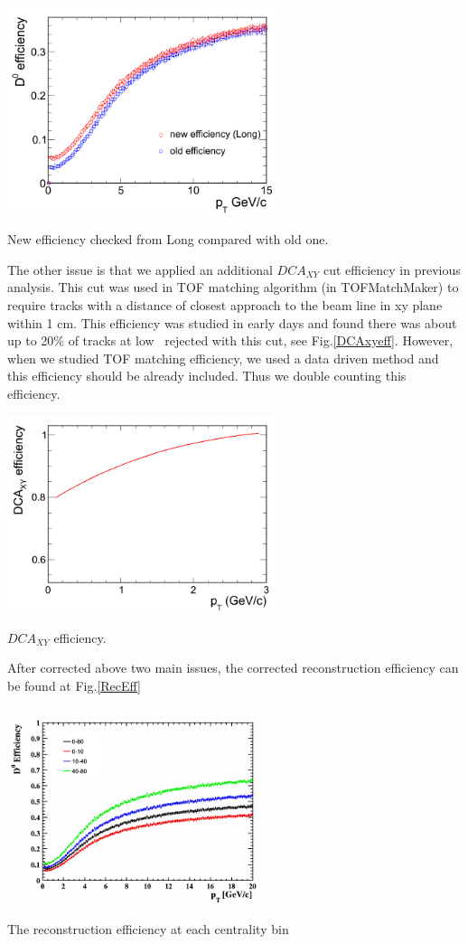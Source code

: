 \bfg \centering
\includegraphics[width=0.6\textwidth]{figure/Run11_YF/eff.png}
\caption{New efficiency checked from Long compared with old one.}
\label{effnew}
\efg

The other issue is that we applied an additional $DCA_{XY}$ cut efficiency in previous analysis. This cut was used in TOF matching algorithm (in TOFMatchMaker) to require tracks with a distance of closest approach to the beam line in xy plane within 1 cm. This efficiency was studied in early days and found there was about up to 20\% of tracks at low \pt\ rejected with this cut, see Fig.\ref{DCAxyeff}. However, when we studied TOF matching efficiency, we used a data driven method and this efficiency should be already included. Thus we double counting this efficiency.

\bfg \centering
\includegraphics[width=0.6\textwidth]{figure/Run11_YF/DCAxyEff.png}
\caption{$DCA_{XY}$ efficiency.}
\label{DCAxyeff}
\efg

After corrected above two main issues, the corrected reconstruction efficiency can be found at Fig.\ref{RecEff}

\bfg \centering
\includegraphics[width=0.6\textwidth]{figure/Run11_YF/rec_eff.png}
\caption{The reconstruction efficiency at each centrality bin}
\label{RecEff}
\efg

